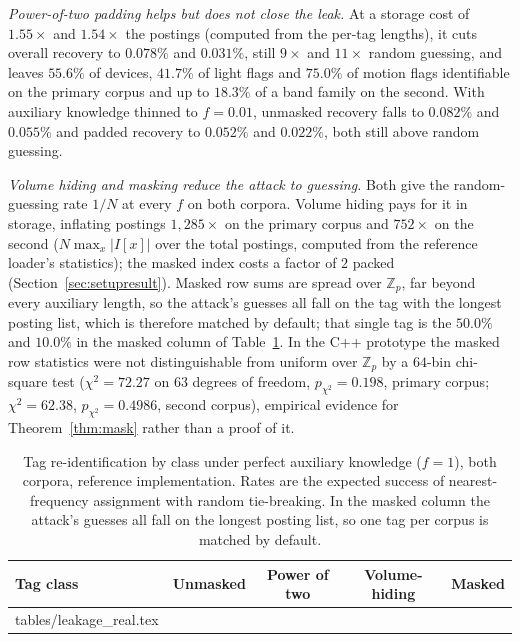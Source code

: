 \documentclass[a4paper,fleqn]{cas-sc}
\begin{document}
\emph{Power-of-two padding helps but does not close the leak.} At a storage
cost of $1.55\times$ and $1.54\times$ the postings (computed from the per-tag
lengths), it cuts overall recovery to $0.078\%$ and $0.031\%$, still $9\times$ and $11\times$ random
guessing, and leaves $55.6\%$ of devices, $41.7\%$ of light flags and $75.0\%$
of motion flags identifiable on the primary corpus and up to $18.3\%$ of a band
family on the second. With auxiliary knowledge thinned to $f=0.01$, unmasked
recovery falls to $0.082\%$ and $0.055\%$ and padded recovery to $0.052\%$ and
$0.022\%$, both still above random guessing.

\emph{Volume hiding and masking reduce the attack to guessing.} Both give the
random-guessing rate $1/N$ at every $f$ on both corpora. Volume hiding pays for
it in storage, inflating postings $1{,}285\times$ on the primary corpus and
$752\times$ on the second ($N\max_x|I[x]|$ over the total postings, computed
from the reference loader's statistics); the masked index costs a factor of $2$
packed (Section~\ref{sec:setupresult}). Masked row sums are spread over
$\mathbb{Z}_p$, far beyond every auxiliary length, so the attack's guesses all
fall on the tag with the longest posting list, which is therefore matched by
default; that single tag is the $50.0\%$ and $10.0\%$ in the masked column of
Table~\ref{tab:leakage}. In the C++ prototype the masked row statistics were
not distinguishable from uniform over $\mathbb{Z}_p$ by a $64$-bin chi-square
test ($\chi^2=72.27$ on $63$ degrees of freedom, $p_{\chi^2}=0.198$, primary
corpus; $\chi^2=62.38$, $p_{\chi^2}=0.4986$, second corpus), empirical
evidence for Theorem~\ref{thm:mask} rather than a proof of it.

\begin{table}[pos=htbp]
\caption{Tag re-identification by class under perfect auxiliary knowledge
($f=1$), both corpora, reference implementation. Rates are the expected
success of nearest-frequency assignment with random tie-breaking. In the
masked column the attack's guesses all fall on the longest posting list, so
one tag per corpus is matched by default.}
\label{tab:leakage}
\centering
\footnotesize
\setlength{\tabcolsep}{3pt}
\begin{tabular*}{\tblwidth}{@{\extracolsep{\fill}}lcccc@{}}
\toprule
Tag class & Unmasked & Power of two & Volume-hiding & Masked \\
\midrule
{} tables/leakage_real.tex 
\bottomrule
\end{tabular*}
\end{table}
\end{document}
